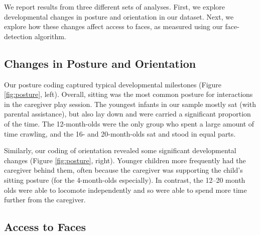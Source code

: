 \documentclass[10pt,letterpaper]{article}
\begin{document}
We report results from three different sets of analyses. First, we explore developmental changes in posture and orientation in our dataset. Next, we explore how these changes affect access to faces, as measured using our face-detection algorithm. 

\subsection{Changes in Posture and Orientation}
 
Our posture coding captured typical developmental milestones (Figure \ref{fig:posture}, left). Overall, sitting was the most common posture for interactions in the caregiver play session. The youngest infants in our sample mostly sat (with parental assistance), but also lay down and were carried a significant proportion of the time. The 12-month-olds were the only group who spent a large amount of time crawling, and the 16- and 20-month-olds sat and stood in equal parts. 



Similarly, our coding of orientation revealed some significant developmental changes (Figure \ref{fig:posture}, right). Younger children more frequently had the caregiver behind them, often because the caregiver was supporting the child's sitting posture (for the 4-month-olds especially). In contrast, the 12--20 month olds were able to locomote independently and so were able to spend more time further from the caregiver. 


\subsection{Access to Faces }



\end{document}
